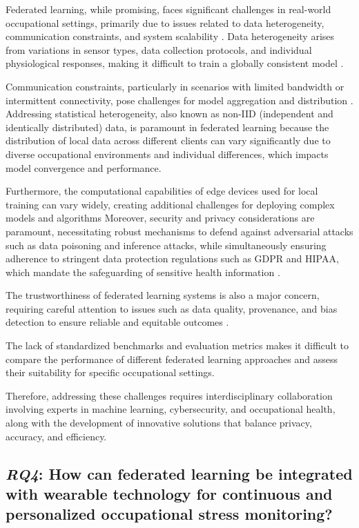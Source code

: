 \documentclass[12pt]{article}
\begin{document}
Federated learning, while promising, faces significant challenges in real-world occupational settings, primarily due to issues related to data heterogeneity, communication constraints, and system scalability \cite{shiyi_jiang_49d728e9}. Data heterogeneity arises from variations in sensor types, data collection protocols, and individual physiological responses, making it difficult to train a globally consistent model \cite{po_chen_lin_822ae077}. 

Communication constraints, particularly in scenarios with limited bandwidth or intermittent connectivity, pose challenges for model aggregation and distribution \cite{tian_li_4bd16a66}. Addressing statistical heterogeneity, also known as non-IID (independent and identically distributed) data, is paramount in federated learning because the distribution of local data across different clients can vary significantly due to diverse occupational environments and individual differences, which impacts model convergence and performance. 

Furthermore, the computational capabilities of edge devices used for local training can vary widely, creating additional challenges for deploying complex models and algorithms \cite{neha_gahlan_d8b04f5d} Moreover, security and privacy considerations are paramount, necessitating robust mechanisms to defend against adversarial attacks such as data poisoning and inference attacks, while simultaneously ensuring adherence to stringent data protection regulations such as GDPR and HIPAA, which mandate the safeguarding of sensitive health information \cite{adam_sadilek_c59c73f4}.

The trustworthiness of federated learning systems is also a major concern, requiring careful attention to issues such as data quality, provenance, and bias detection to ensure reliable and equitable outcomes \cite{jie_xu_193cbfb6}.

The lack of standardized benchmarks and evaluation metrics makes it difficult to compare the performance of different federated learning approaches and assess their suitability for specific occupational settings. 

Therefore, addressing these challenges requires interdisciplinary collaboration involving experts in machine learning, cybersecurity, and occupational health, along with the development of innovative solutions that balance privacy, accuracy, and efficiency.


\subsection{\textit{RQ4}: How can federated learning be integrated with wearable technology for continuous and personalized occupational stress monitoring?}
\end{document}
